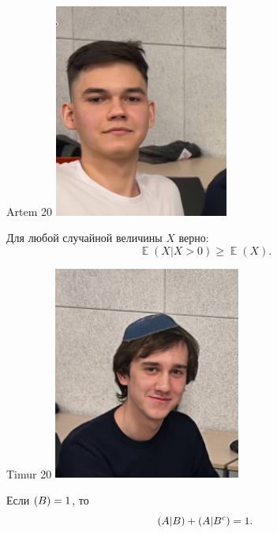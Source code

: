 \documentclass[12pt]{article}
\let\P\relax
\DeclareMathOperator{\P}{\mathbb{P}}
\DeclareMathOperator{\E}{\mathbb{E}}
\begin{document}
\begin{minipage}{0.45\textwidth}
\begin{tinderm}{Artem 20}
\includegraphics[height=7cm]{tinder-photo/artem.png}

  

\begin{mybox}
Для любой случайной величины $X$ верно:  
\[
\E(X | X > 0) \ge \E(X).
\]
\end{mybox}
\end{tinderm}
\end{minipage}
%
%
\begin{minipage}{0.45\textwidth}
\begin{tinderm}{Timur 20}
\includegraphics[height=7cm]{tinder-photo/timur_2.png}

  

\begin{mybox}
Если $\P(B)=1$, то 
\[
\P(A|B) + \P(A|B^c) = 1.
\]
\end{mybox}
\end{tinderm}
\end{minipage}
\end{document}
